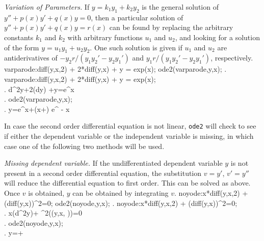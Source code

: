 \medskip

\noindent
\textit{Variation of Parameters.}\quad
If $y=k_1y_1 + k_2y_2$ is the general solution of
$y'' + p(x)y' + q(x)y = 0$,  then a particular solution 
of $y'' + p(x)y' + q(x)y = r(x)$ can
be found by replacing the arbitrary constants $k_1$ and $k_2$ with
arbitrary functions $u_1$ and $u_2$, and looking for a solution of the
form $y=u_1y_1 + u_2y_2$.  One such solution is given if $u_1$ and
$u_2$ are antiderivatives of $-y_2r/(y_1y_2' - y_2y_1')$ and
$y_1r/(y_1y_2' - y_2y_1')$, respectively.
\beginmaximasession
varparode:diff(y,x,2) + 2*diff(y,x) + y = exp(x);
ode2(varparode,y,x);
\maximatexsession
{}.  varparode:diff(y,x,2) + 2*diff(y,x) + y = exp(x); \\
.   {{d^{2}}}\*y+2\*\left({{d}}\*y\right)
 +y=e^{x} \\
.  ode2(varparode,y,x); \\
.   y={{e^{x}}}+\left(\*x+\right)
 \*e^ {- x } \\
\endmaximasession

\medskip

In case the second order differential equation is not linear,
\texttt{ode2} will check to see if either the dependent variable or
the independent variable is missing, in which case one of the following two
methods will be used.

\smallskip

\noindent
\textit{Missing dependent variable.}\quad
If the undifferentiated dependent variable $y$ is not present in a
second order differential equation, the substitution $v=y'$, $v'=y''$
will reduce the differential equation to first order.  This can be
solved as above. Once $v$ is obtained, $y$ can be obtained by
integrating $v$. 
\beginmaximasession
noyode:x*diff(y,x,2) + (diff(y,x))^2=0;
ode2(noyode,y,x);
\maximatexsession
{}.  noyode:x*diff(y,x,2) + (diff(y,x))^2=0; \\
.   x\*\left({{d^{2}}}\*y\right)+
 ^{2}\left(\left(y,\linebreak[0]x,
 \right)\right)=0 \\
.  ode2(noyode,y,x); \\
.   y=+ \\
\endmaximasession

\smallskip

